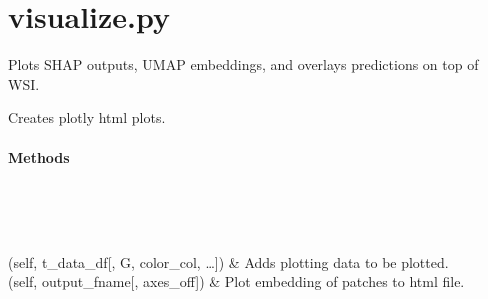 \documentclass[letterpaper,10pt,english]{sphinxmanual}
\begin{document}
\label{\detokenize{index:module-pathflowai.visualize}}

\chapter{visualize.py}
\label{\detokenize{index:visualize-py}}
Plots SHAP outputs, UMAP embeddings, and overlays predictions on top of WSI.

\begin{fulllineitems}
\label{\detokenize{index:pathflowai.visualize.PlotlyPlot}}
Creates plotly html plots.
\subsubsection*{Methods}


\begin{savenotes}\sphinxatlongtablestart\begin{longtable}[c]{}
\hline

\endfirsthead

%
{}\\
\hline

\endhead

\hline
{}\\
\endfoot

\endlastfoot

{\hyperref[\detokenize{index:pathflowai.visualize.PlotlyPlot.add_plot}]{}}(self, t\_data\_df{[}, G, color\_col, …{]})
&
Adds plotting data to be plotted.
\\
\hline
{\hyperref[\detokenize{index:pathflowai.visualize.PlotlyPlot.plot}]{}}(self, output\_fname{[}, axes\_off{]})
&
Plot embedding of patches to html file.
\\
\hline
\end{longtable}\sphinxatlongtableend\end{savenotes}


\end{fulllineitems}
\end{document}
